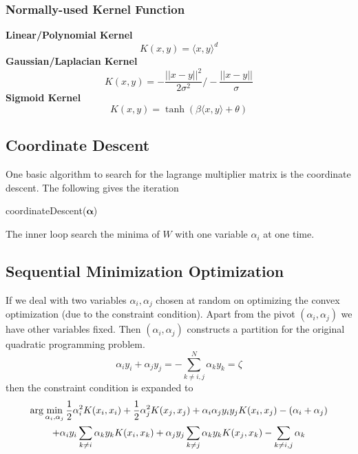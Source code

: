\documentclass[12pt]{article}
\newcommand{\la}{\langle}
\newcommand{\ra}{\rangle}
\begin{document}
\subsubsection{Normally-used Kernel Function}
\noindent \textbf{Linear/Polynomial Kernel} 
\begin{equation}
    K(x, y) = \la x, y \ra^d
\end{equation}
\textbf{Gaussian/Laplacian Kernel}
\begin{equation}
    K(x, y) = -\frac{||x - y||^2}{2\sigma^2} \bigg/ -\frac{||x-y||}{\sigma}
\end{equation}
\textbf{Sigmoid Kernel}
\begin{equation}
    K(x, y) = \tanh \left( \beta \la x, y \ra + \theta\right)
\end{equation}
\subsection{Coordinate Descent}
One basic algorithm to search for the lagrange multiplier matrix is the coordinate descent. The following gives the iteration
\begin{algorithm}[H]
    \caption{coordinateDescent($\bm{\alpha}$)}
    \label{coorDes}
    \begin{algorithmic}
        \ENDFOR
        \ENDWHILE
    \end{algorithmic}
\end{algorithm}
The inner loop search the minima of $W$ with one variable $\alpha_i$ at one time.
\subsection{Sequential Minimization Optimization}
If we deal with two variables $\alpha_i, \alpha_j$ chosen at random on optimizing the convex optimization (due to the constraint condition). Apart from the pivot $(\alpha_i, \alpha_j)$ we have other variables fixed. Then $(\alpha_i, \alpha_j)$ constructs a partition for the original quadratic programming problem.
\begin{equation}
    \alpha_iy_i + \alpha_jy_j = -\sum_{k \neq i,j}^N \alpha_k y_k =   \zeta
\end{equation}
then the constraint condition is expanded to
\begin{gather}
    \arg \min_{\alpha_i, \alpha_j} \frac{1}{2} \alpha_i^2 K(x_i, x_i) + \frac{1}{2}\alpha_j^2 K(x_j, x_j) + \alpha_i\alpha_j y_i y_j K(x_i, x_j) - (\alpha_i + \alpha_j) \notag \\ + \alpha_i y_i \sum_{k\neq i} \alpha_k y_k K(x_i, x_k) + \alpha_j y_j \sum_{k\neq j}
    \alpha_k y_k K(x_j, x_k) - \sum_{k\neq i, j} \alpha_k
\end{gather}
\end{document}
